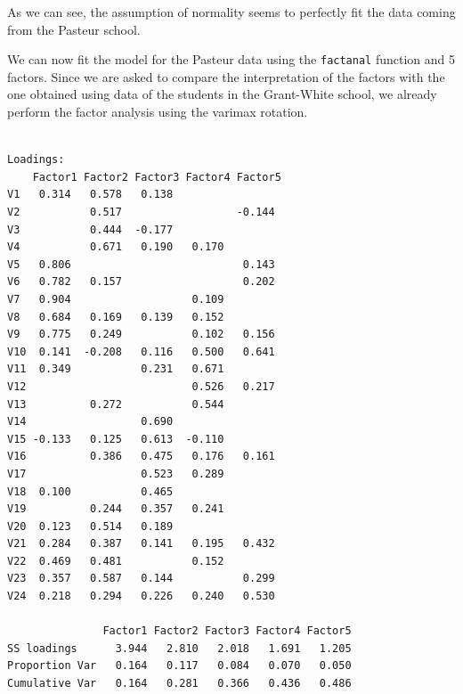 \documentclass[
  letterpaper,
  DIV=11,
  numbers=noendperiod]{scrartcl}
\newenvironment{Shaded}{\begin{snugshade}}{\end{snugshade}}
\newcommand{\AttributeTok}[1]{\textcolor[rgb]{0.40,0.45,0.13}{#1}}
\newcommand{\DecValTok}[1]{\textcolor[rgb]{0.68,0.00,0.00}{#1}}
\newcommand{\FloatTok}[1]{\textcolor[rgb]{0.68,0.00,0.00}{#1}}
\newcommand{\FunctionTok}[1]{\textcolor[rgb]{0.28,0.35,0.67}{#1}}
\newcommand{\NormalTok}[1]{\textcolor[rgb]{0.00,0.23,0.31}{#1}}
\newcommand{\OtherTok}[1]{\textcolor[rgb]{0.00,0.23,0.31}{#1}}
\newcommand{\SpecialCharTok}[1]{\textcolor[rgb]{0.37,0.37,0.37}{#1}}
\newcommand{\StringTok}[1]{\textcolor[rgb]{0.13,0.47,0.30}{#1}}
\begin{document}
As we can see, the assumption of normality seems to perfectly fit the
data coming from the Pasteur school.

We can now fit the model for the Pasteur data using the
\texttt{factanal} function and 5 factors. Since we are asked to compare
the interpretation of the factors with the one obtained using data of
the students in the Grant-White school, we already perform the factor
analysis using the varimax rotation.

\begin{Shaded}
\end{Shaded}

\begin{verbatim}

Loadings:
    Factor1 Factor2 Factor3 Factor4 Factor5
V1   0.314   0.578   0.138                 
V2           0.517                  -0.144 
V3           0.444  -0.177                 
V4           0.671   0.190   0.170         
V5   0.806                           0.143 
V6   0.782   0.157                   0.202 
V7   0.904                   0.109         
V8   0.684   0.169   0.139   0.152         
V9   0.775   0.249           0.102   0.156 
V10  0.141  -0.208   0.116   0.500   0.641 
V11  0.349           0.231   0.671         
V12                          0.526   0.217 
V13          0.272           0.544         
V14                  0.690                 
V15 -0.133   0.125   0.613  -0.110         
V16          0.386   0.475   0.176   0.161 
V17                  0.523   0.289         
V18  0.100           0.465                 
V19          0.244   0.357   0.241         
V20  0.123   0.514   0.189                 
V21  0.284   0.387   0.141   0.195   0.432 
V22  0.469   0.481           0.152         
V23  0.357   0.587   0.144           0.299 
V24  0.218   0.294   0.226   0.240   0.530 

               Factor1 Factor2 Factor3 Factor4 Factor5
SS loadings      3.944   2.810   2.018   1.691   1.205
Proportion Var   0.164   0.117   0.084   0.070   0.050
Cumulative Var   0.164   0.281   0.366   0.436   0.486
\end{verbatim}
\end{document}
